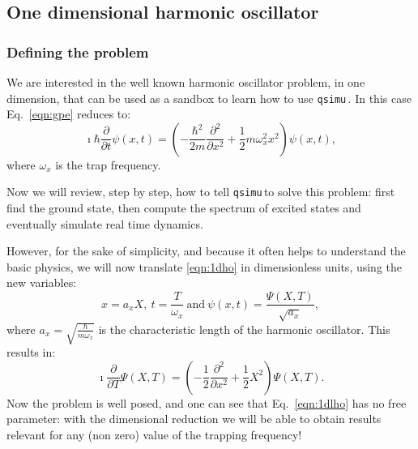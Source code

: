 \documentclass[12pt,a4paper]{report}
\newcommand{\qsimu}{\texttt{qsimu}\,}
\begin{document}
\subsection{One dimensional harmonic oscillator}
\subsubsection{Defining the problem}
We are interested in the well known harmonic oscillator problem, in one dimension, that can be used as a sandbox to learn how to use \qsimu. 
In this case Eq.~\eqref{eqn:gpe} reduces to:
\begin{equation}
\imath\hbar\frac{\partial}{\partial t}\psi(x,t)=\left(-\frac{\hbar^2}{2m}\frac{\partial^2}{\partial x^2}+\frac{1}{2}m\omega_x^2 x^2\right)\psi(x,t),
\label{eqn:1dho}
\end{equation}
where $\omega_x$ is the trap frequency.

Now we will review, step by step, how to tell \qsimu to solve this problem: first find the ground state, then compute the spectrum of excited states and eventually simulate real time dynamics.

However, for the sake of simplicity, and because it often helps to understand the basic physics, we will now translate \eqref{eqn:1dho} in dimensionless units, using the new variables:
\begin{equation*}
x=a_xX,~t=\frac{T}{\omega_x}~\textrm{and}~\psi(x,t)=\frac{\Psi(X,T)}{\sqrt{a_x}},
\end{equation*}
where $a_x=\sqrt{\frac{\hbar}{m\omega_x}}$ is the characteristic length of the harmonic oscillator.
This results in:
\begin{equation}
\imath\frac{\partial}{\partial T}\Psi(X,T)=\left(-\frac{1}{2}\frac{\partial^2}{\partial x^2}+\frac{1}{2}X^2\right)\Psi(X,T).
\label{eqn:1dlho}
\end{equation}
Now the problem is well posed, and one can see that Eq.~\eqref{eqn:1dlho} has no free parameter: with the dimensional reduction we will be able to obtain results relevant for any (non zero) value of the trapping frequency!
\end{document}
